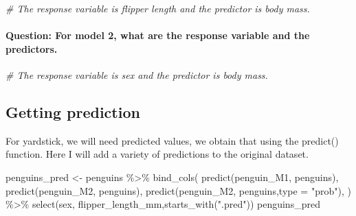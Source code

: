 \documentclass[
]{article}
\newenvironment{Shaded}{\begin{snugshade}}{\end{snugshade}}
\newcommand{\AttributeTok}[1]{\textcolor[rgb]{0.77,0.63,0.00}{#1}}
\newcommand{\CommentTok}[1]{\textcolor[rgb]{0.56,0.35,0.01}{\textit{#1}}}
\newcommand{\FunctionTok}[1]{\textcolor[rgb]{0.00,0.00,0.00}{#1}}
\newcommand{\NormalTok}[1]{#1}
\newcommand{\OtherTok}[1]{\textcolor[rgb]{0.56,0.35,0.01}{#1}}
\newcommand{\SpecialCharTok}[1]{\textcolor[rgb]{0.00,0.00,0.00}{#1}}
\newcommand{\StringTok}[1]{\textcolor[rgb]{0.31,0.60,0.02}{#1}}
\begin{document}
\begin{Shaded}
\begin{Highlighting}[]
\CommentTok{\# The response variable is flipper length and the predictor is body mass.}
\end{Highlighting}
\end{Shaded}

\hypertarget{question-for-model-2-what-are-the-response-variable-and-the-predictors.}{%
\paragraph{Question: For model 2, what are the response variable and the
predictors.}\label{question-for-model-2-what-are-the-response-variable-and-the-predictors.}}

\begin{Shaded}
\begin{Highlighting}[]
\CommentTok{\# The response variable is sex and the predictor is body mass.}
\end{Highlighting}
\end{Shaded}

\hypertarget{getting-prediction}{%
\subsection{Getting prediction}\label{getting-prediction}}

For yardstick, we will need predicted values, we obtain that using the
predict() function. Here I will add a variety of predictions to the
original dataset.

\begin{Shaded}
\begin{Highlighting}[]
\NormalTok{penguins\_pred }\OtherTok{\textless{}{-}}\NormalTok{ penguins }\SpecialCharTok{\%\textgreater{}\%} 
  \FunctionTok{bind\_cols}\NormalTok{( }\FunctionTok{predict}\NormalTok{(penguin\_M1, penguins), }
             \FunctionTok{predict}\NormalTok{(penguin\_M2, penguins), }
             \FunctionTok{predict}\NormalTok{(penguin\_M2, penguins,}\AttributeTok{type =} \StringTok{"prob"}\NormalTok{),}
\NormalTok{            ) }\SpecialCharTok{\%\textgreater{}\%} 
  \FunctionTok{select}\NormalTok{(sex, flipper\_length\_mm,}\FunctionTok{starts\_with}\NormalTok{(}\StringTok{".pred"}\NormalTok{)) }
\NormalTok{penguins\_pred}
\end{Highlighting}
\end{Shaded}
\end{document}
